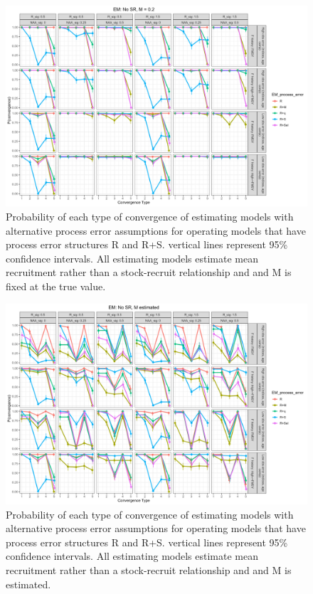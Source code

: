 \documentclass[
  12pt,
]{article}
\begin{document}
\begin{landscape}
\begin{figure}
\caption{Probability of each type of convergence of estimating models with alternative process error assumptions for operating models that have process error structures R and R+S. vertical lines represent 95\% confidence intervals. All estimating models estimate mean recruitment rather than a stock-recruit relationship and and M is fixed at the true value.}\label{naa_om_em_R_MF_convergence}
\begin{center}
\includegraphics[width = \textwidth]{naa_om_p_convergence_meanR_M_fixed.png}
\end{center}
\end{figure}
\end{landscape}

\begin{landscape}
\begin{figure}
\caption{Probability of each type of convergence of estimating models with alternative process error assumptions for operating models that have process error structures R and R+S. vertical lines represent 95\% confidence intervals. All estimating models estimate mean recruitment rather than a stock-recruit relationship and and M is estimated.}\label{naa_om_em_R_ME_convergence}
\begin{center}
\includegraphics[width = \textwidth]{naa_om_p_convergence_meanR_M_estimated.png}
\end{center}
\end{figure}
\end{landscape}
\end{document}
